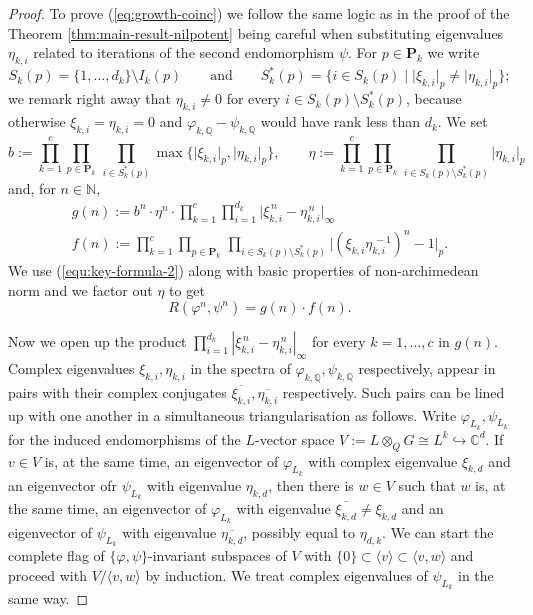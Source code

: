\documentclass[12pt, a4paper]{amsart}
\def\C{{\mathbb C}}
\def\Q{{\mathbb Q}}
\begin{document}
\begin{proof}
 To prove (\ref{eq:growth-coinc}) we follow the same logic as in the proof of the Theorem \ref{thm:main-result-nilpotent}
 being careful when substituting eigenvalues $\eta_{k,i}$ related to iterations of the second endomorphism $\psi$.
  For $p \in \mathbf{P}_k$ we write
  \[
    S_k(p) = \{1,\ldots,d_k\} \setminus I_k(p) \qquad \text{and} \qquad
    S^*_k(p) = \{i \in S_k(p) \mid \lvert \xi_{k,i} \rvert_p \neq \lvert
    \eta_{k,i} \rvert_p\};
  \]
  we remark right away that $\eta_{k,i} \neq 0$ for every
  $i \in S_k(p) \setminus S^*_k(p)$, because otherwise
  $\xi_{k,i} = \eta_{k,i} = 0$ and $\varphi_{k,\mathbb{Q}} - \psi_{k,\mathbb{Q}}$
  would have rank less than $d_k$.
  We set
  \[
    b := \prod_{k=1}^c \prod_{p \in \mathbf{P}_k} \, \prod_{i \in S^*_k(p)} \max \{ \lvert
    \xi_{k,i} \rvert_p, \lvert \eta_{k,i} \rvert_p \}, \qquad
    \eta := \prod_{k=1}^c \prod_{p \in \mathbf{P}_k} \, \prod_{i \in S_k(p)\setminus
      S^*_k(p)}\lvert \eta_{k,i} \rvert_p
  \]
  and, for $n \in \mathbb{N}$,
  \begin{gather*}
    g(n) := b^n\cdot\eta^n \cdot \prod_{k=1}^c \prod_{i=1}^{d_k} \lvert \xi_{k,i}^{\, n} - \eta_{k,i}^{\, n}
    \rvert_\infty \\
    f(n) := \prod_{k=1}^c \prod_{p \in \mathbf{P}_k} \, \prod_{i \in S_k(p)\setminus
      S_k^*(p)} \big\vert (\xi_{k,i} \eta_{k,i}^{\, -1})^n - 1 \big\vert_p.
  \end{gather*}
  We use (\ref{equ:key-formula-2}) along with basic properties of non-archimedean norm and we factor out $\eta$ to get
  \begin{equation}\label{eq:reidemeister-coincidence-g-f}
     R(\varphi^n, \psi^n) = g(n) \cdot f(n).
  \end{equation}

  Now we open up the product $\prod_{i=1}^{d_k} |\xi_{k,i}^{\, n} - \eta_{k,i}^{\, n}|_\infty$
  for every $k=1,\dots,c$ in $g(n)$.
  Complex eigenvalues $\xi_{k,i}, \eta_{k,i}$ in the spectra of $\varphi_{k,\Q}, \psi_{k,\Q}$ respectively,
  appear in pairs with their complex conjugates $\overline{\xi_{k,i}}, \overline{\eta_{k,i}}$ respectively.
  Such pairs can be lined up with one another in a simultaneous triangularisation as follows.
  Write $\varphi_{L_k}, \psi_{L_k}$ for the induced endomorphisms of the $L$-vector space
  $V := L \otimes_Q G \cong L^k \hookrightarrow \C^d$.
  If $v \in V$ is, at the same time, an eigenvector of $\varphi_{L_k}$ with complex eigenvalue $\xi_{k,d}$
  and an eigenvector ofr $\psi_{L_k}$ with eigenvalue $\eta_{k,d}$,
  then there is $w \in V$ such that $w$ is, at the same time, an eigenvector of $\varphi_{L_k}$
  with eigenvalue $\overline{\xi_{k,d}} \neq \xi_{k,d}$ and an eigenvector of $\psi_{L_k}$
  with eigenvalue $\overline{\eta_{k,d}}$, possibly equal to $\eta_{d,k}$.
  We can start the complete flag of $\{\varphi, \psi\}$-invariant subspaces of $V$ with
  $\{0\} \subset \langle v \rangle \subset \langle v, w \rangle$ and proceed with
  $V / \langle v, w \rangle$ by induction.
  We treat complex eigenvalues of $\psi_{L_k}$ in the same way.


\end{proof}
\end{document}
